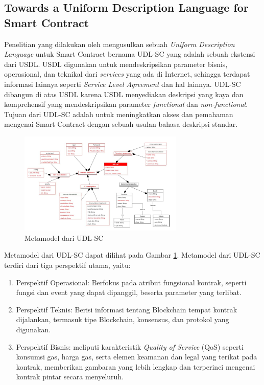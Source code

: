 \subsection{Towards a Uniform Description Language for Smart Contract}
\label{subsec:uniform-description-language}

Penelitian yang dilakukan oleh \cite{udlsc} mengusulkan sebuah \textit{Uniform Description Language} untuk Smart Contract bernama UDL-SC yang adalah sebuah ekstensi dari USDL. USDL digunakan untuk mendeskripsikan parameter bisnis, operasional, dan teknikal dari \textit{services} yang ada di Internet, sehingga terdapat informasi lainnya seperti \textit{Service Level Agreement} dan hal lainnya. UDL-SC dibangun di atas USDL karena USDL menyediakan deskripsi yang kaya dan komprehensif yang mendeskripsikan parameter \textit{functional} dan \textit{non-functional}. Tujuan dari UDL-SC adalah untuk meningkatkan akses dan pemahaman mengenai Smart Contract dengan sebuah usulan bahasa deskripsi standar.

\begin{figure}[ht]
	\centering
	\includegraphics[width=0.7\textwidth]{resources/chapter-2/metamodel-udl-sc.png}
	\caption{Metamodel dari UDL-SC \parencite{udlsc}}
	\label{image:metamodel-udl-sc}
\end{figure}

Metamodel dari UDL-SC dapat dilihat pada Gambar \ref{image:metamodel-udl-sc}. Metamodel dari UDL-SC terdiri dari tiga perspektif utama, yaitu:

\begin{enumerate}
	\item Perspektif Operasional: Berfokus pada atribut fungsional kontrak, seperti fungsi dan event yang dapat dipanggil, beserta parameter yang terlibat.
	\item Perspektif Teknis: Berisi informasi tentang Blockchain tempat kontrak dijalankan, termasuk tipe Blockchain, konsensus, dan protokol yang digunakan.
	\item Perspektif Bisnis: meliputi karakteristik \textit{Quality of Service} (QoS) seperti konsumsi gas, harga gas, serta elemen keamanan dan legal yang terikat pada kontrak, memberikan gambaran yang lebih lengkap dan terperinci mengenai kontrak pintar secara menyeluruh.
\end{enumerate}

